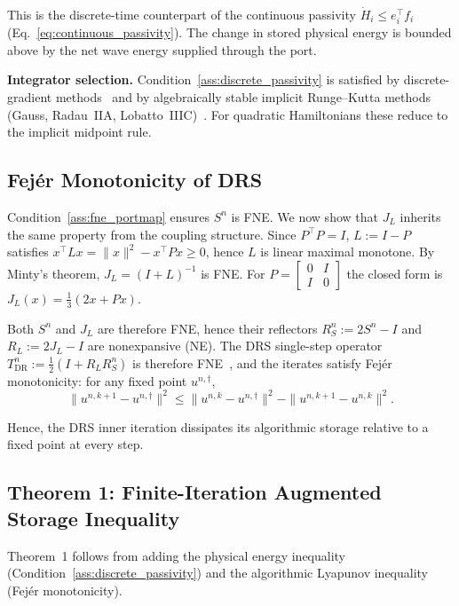 This is the discrete-time counterpart of the continuous passivity $\dot{H}_i \leq e_i^\top f_i$ (Eq.~\eqref{eq:continuous_passivity}). The change in stored physical energy is bounded above by the net wave energy supplied through the port.

\textbf{Integrator selection.}
Condition~\ref{ass:discrete_passivity} is satisfied by discrete-gradient methods~\cite{robert2014Discrete,celledoni2012preserving} and by algebraically stable implicit Runge--Kutta methods (Gauss, Radau~IIA, Lobatto~IIIC)~\cite{wanner1996solving}. For quadratic Hamiltonians these reduce to the implicit midpoint rule.

\subsection{Fejér Monotonicity of DRS}
\label{subsec:fejer_monotonicity}

Condition~\ref{ass:fne_portmap} ensures $S^n$ is FNE. We now show that $J_L$ inherits the same property from the coupling structure. Since $P^\top P = I$, $L := I-P$ satisfies $x^\top L x = \|x\|^2 - x^\top P x \ge 0$, hence $L$ is linear maximal monotone. By Minty's theorem, $J_L = (I+L)^{-1}$ is FNE. For $P=\begin{bmatrix}0&I\\I&0\end{bmatrix}$ the closed form is $J_L(x)=\frac13(2x+Px)$.

Both $S^n$ and $J_L$ are therefore FNE, hence their reflectors $R_S^n := 2S^n - I$ and $R_L := 2J_L - I$ are nonexpansive (NE). The DRS single-step operator $T_{\text{DR}}^n := \frac{1}{2}(I + R_L R_S^n)$ is therefore FNE~\cite{bauschke2017convex}, and the iterates satisfy Fejér monotonicity: for any fixed point $u^{n,\dagger}$,
\begin{equation} 
\|u^{n,k+1} - u^{n,\dagger}\|^2 \leq \|u^{n,k} - u^{n,\dagger}\|^2 - \|u^{n,k+1} - u^{n,k}\|^2.
\label{eq:fejer}
\end{equation}

Hence, the DRS inner iteration dissipates its algorithmic storage relative to a fixed point at every step.

\subsection{Theorem 1: Finite-Iteration Augmented Storage Inequality}
\label{subsec:theorem1}
Theorem~1 follows from adding the physical energy inequality (Condition~\ref{ass:discrete_passivity}) and the algorithmic Lyapunov inequality (Fejér monotonicity).

